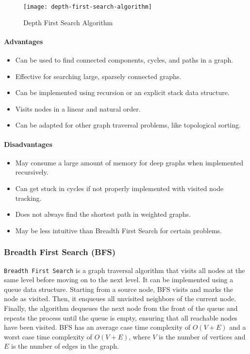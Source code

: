 \begin{figure}[!htbp]
    \centering
    \texttt{[image: depth-first-search-algorithm]}
    \caption{Depth First Search Algorithm \cite{zaltsman_dfs_bfs}}
    \label{fig:depth-first-search-algorithm}
\end{figure}

\paragraph{Advantages}
\begin{itemize}
    \item Can be used to find connected components, cycles, and paths in a graph.
    \item Effective for searching large, sparsely connected graphs.
    \item Can be implemented using recursion or an explicit stack data structure.
    \item Visits nodes in a linear and natural order.
    \item Can be adapted for other graph traversal problems, like topological sorting.
\end{itemize}
\paragraph{Disadvantages}
\begin{itemize}
    \item May consume a large amount of memory for deep graphs when implemented recursively.
    \item Can get stuck in cycles if not properly implemented with visited node tracking.
    \item Does not always find the shortest path in weighted graphs.
    \item May be less intuitive than Breadth First Search for certain problems.
\end{itemize}

\subsubsection{Breadth First Search (BFS)}
\lstinline{Breadth First Search} is a graph traversal algorithm that visits all nodes at the same level before moving on to the next level. It can be implemented using a queue data structure. Starting from a source node, BFS visits and marks the node as visited. Then, it enqueues all unvisited neighbors of the current node. Finally, the algorithm dequeues the next node from the front of the queue and repeats the process until the queue is empty, ensuring that all reachable nodes have been visited. BFS has an average case time complexity of $O(V + E)$ and a worst case time complexity of $O(V + E)$, where $V$ is the number of vertices and $E$ is the number of edges in the graph.

